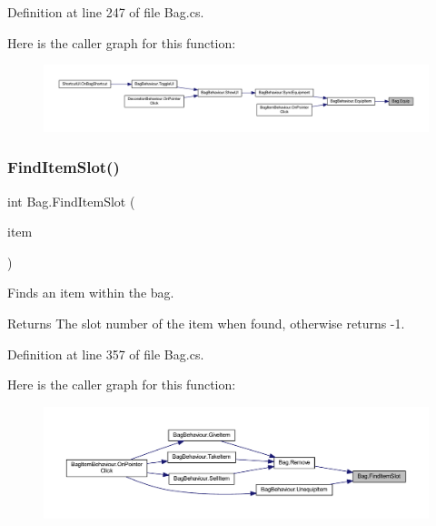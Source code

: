 Definition at line 247 of file Bag.\+cs.

Here is the caller graph for this function\+:
\nopagebreak
\begin{figure}[H]
\begin{center}
\leavevmode
\includegraphics[width=350pt]{class_bag_a975e4ef7a5647327225e5b587b32c066_icgraph}
\end{center}
\end{figure}
\mbox{\label{class_bag_a0f77c6c4e4e4782d81256fa81e7d18f4}} 
\subsubsection{\texorpdfstring{FindItemSlot()}{FindItemSlot()}}
{\footnotesize\ttfamily int Bag.\+Find\+Item\+Slot (\begin{DoxyParamCaption}\item[{\mbox{\hyperlink{class_base_item}{Base\+Item}}}]{item }\end{DoxyParamCaption})}



Finds an item within the bag. 

\begin{DoxyReturn}{Returns}
The slot number of the item when found, otherwise returns -\/1.
\end{DoxyReturn}


Definition at line 357 of file Bag.\+cs.

Here is the caller graph for this function\+:
\nopagebreak
\begin{figure}[H]
\begin{center}
\leavevmode
\includegraphics[width=350pt]{class_bag_a0f77c6c4e4e4782d81256fa81e7d18f4_icgraph}
\end{center}
\end{figure}
\mbox{\label{class_bag_a089ef28af0c9fe39cc430b1826a313a7}} 
